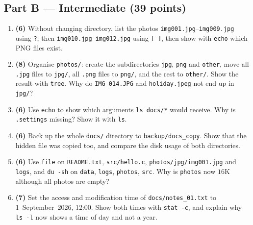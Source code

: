 \documentclass[11pt,a4paper]{article}
\newcommand{\cmd}[1]{\texttt{#1}}
\begin{document}
\subsection*{Part B --- Intermediate (39 points)}
\begin{enumerate}[leftmargin=2.2em,label=\textbf{\arabic*.},start=8]
  \item \textbf{(6)} Without changing directory, list the photos \texttt{img001.jpg}--\texttt{img009.jpg} using \texttt{?}, then \texttt{img010.jpg}--\texttt{img012.jpg} using \texttt{[\,]}, then show with \cmd{echo} which PNG files exist.
  \item \textbf{(8)} Organise \texttt{photos/}: create the subdirectories \texttt{jpg}, \texttt{png} and \texttt{other}, move all \texttt{.jpg} files to \texttt{jpg/}, all \texttt{.png} files to \texttt{png/}, and the rest to \texttt{other/}. Show the result with \cmd{tree}. Why do \texttt{IMG\_014.JPG} and \texttt{holiday.jpeg} not end up in \texttt{jpg/}?
  \item \textbf{(6)} Use \cmd{echo} to show which arguments \cmd{ls docs/*} would receive. Why is \texttt{.settings} missing? Show it with \cmd{ls}.
  \item \textbf{(6)} Back up the whole \texttt{docs/} directory to \texttt{backup/docs\_copy}. Show that the hidden file was copied too, and compare the disk usage of both directories.
  \item \textbf{(6)} Use \cmd{file} on \texttt{README.txt}, \texttt{src/hello.c}, \texttt{photos/jpg/img001.jpg} and \texttt{logs}, and \cmd{du -sh} on \texttt{data}, \texttt{logs}, \texttt{photos}, \texttt{src}. Why is \texttt{photos} now $16$K although all photos are empty?
  \item \textbf{(7)} Set the access and modification time of \texttt{docs/notes\_01.txt} to 1~September~2026, 12:00. Show both times with \cmd{stat -c}, and explain why \cmd{ls -l} now shows a time of day and not a year.
\end{enumerate}
\end{document}
